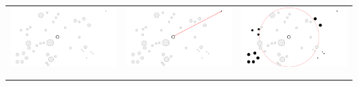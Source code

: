 \documentclass[]{article}
\begin{document}
\begin{table}
		\begin{tabular}{c|c|c}
			\includegraphics[scale = 0.15]{images/RR1.png} & 
			\includegraphics[scale = 0.15]{images/RR2.png}  & 
			\includegraphics[scale = 0.15]{images/RR3.png}\\
			\\ \hline \\
			

\end{tabular}
\end{table}
\end{document}
